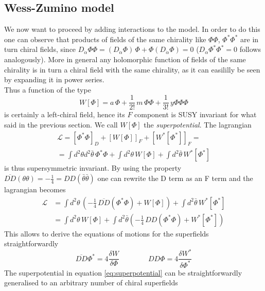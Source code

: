 \documentclass[12pt]{article}
\begin{document}
\subsection*{Wess-Zumino model}
We now want to proceed by adding interactions to the model. In order to do this one can observe that products of fields of the same chirality like $\Phi\Phi$, $\Phi^*\Phi^*$ are in turn chiral fields, since 
$D_{\dot\alpha} \Phi\Phi = (D_{\dot\alpha} \Phi) \, \Phi + \Phi (D_{\dot\alpha} \Phi) = 0$ ($D_\alpha \Phi^*\Phi^*=0$ follows analogously). More in general any holomorphic function of fields of the same chirality is in turn a chiral field with the same chirality, as it can easililly be seen by expanding it in power series. \\
Thus a function of the type
\begin{equation}
  W[\Phi] = a \, \Phi + \frac{1}{2!} \, m \, \Phi\Phi + \frac{1}{3!} \, y \Phi \Phi \Phi
  \label{eq:superpotential}
\end{equation}
is certainly a left-chiral field, hence its $F$ component is SUSY invariant for what said in the previous section. We call $W[\Phi]$ the \emph{superpotential}. The lagrangian
\begin{gather*}
  \mathcal{L} = \left[\Phi^*\Phi\right]_D + \left[W[\Phi]\right]_F + \left[W^*[\Phi^*]\right]_F = \\
  = \int d^2\theta d^2\bar\theta \, \Phi^*\Phi + \int d^2\theta \, W[\Phi] + \int d^2 \bar\theta \, W^*[\Phi^*] 
\end{gather*}
is thus supersymmetric invariant. By using the property $\overline{DD}(\theta\theta) = -\frac{1}{4} = DD(\bar\theta\bar\theta)$ one can rewrite the D term as an F term and the lagrangian becomes
\begin{align*}
  \mathcal{L} &= \int d^2\theta \, \left(-\frac{1}{4} \, \overline{DD}(\Phi^*\Phi) + W[\Phi]\right) + \int d^2\bar\theta \, W^*[\Phi^*] \\
  &= \int d^2\theta \, W[\Phi] + \int d^2\bar\theta \left(-\frac{1}{4} \, DD(\Phi^*\Phi) + W^*[\Phi^*]\right)
\end{align*}
This allows to derive the equations of motions for the superfields straightforwardly
\begin{equation*}
  \overline{DD} \Phi^* = 4\frac{\delta W}{\delta \Phi} \qquad\qquad  DD\Phi = 4\frac{\delta W^*}{\delta \Phi^*}
\end{equation*}
The superpotential in equation \ref{eq:superpotential} can be straightforwardly generalised to an arbitrary number of chiral superfields \
\end{document}
